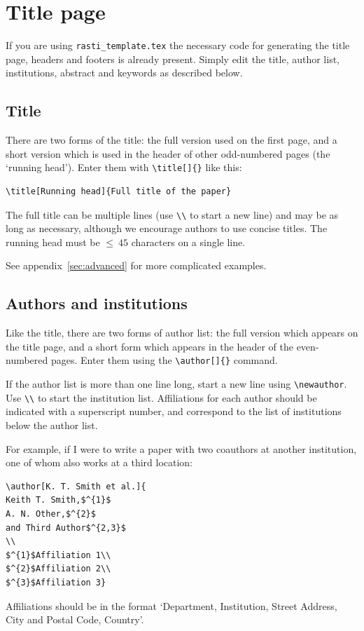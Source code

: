 \documentclass[fleqn,usenatbib,useAMS]{rasti}
\begin{document}
\section{Title page}

If you are using \texttt{rasti\_template.tex} the necessary code for generating the title page, headers and footers is already present.
Simply edit the title, author list, institutions, abstract and keywords as described below.

\subsection{Title}
There are two forms of the title: the full version used on the first page, and a short version which is used in the header of other odd-numbered pages (the `running head').
Enter them with \verb'\title[]{}' like this:
\begin{verbatim}
\title[Running head]{Full title of the paper}
\end{verbatim}
The full title can be multiple lines (use \verb'\\' to start a new line) and may be as long as necessary, although we encourage authors to use concise titles. The running head must be $\le~45$ characters on a single line.

See appendix~\ref{sec:advanced} for more complicated examples.

\subsection{Authors and institutions}

Like the title, there are two forms of author list: the full version which appears on the title page, and a short form which appears in the header of the even-numbered pages. Enter them using the \verb'\author[]{}' command.

If the author list is more than one line long, start a new line using \verb'\newauthor'. Use \verb'\\' to start the institution list. Affiliations for each author should be indicated with a superscript number, and correspond to the list of institutions below the author list.

For example, if I were to write a paper with two coauthors at another institution, one of whom also works at a third location:
\begin{verbatim}
\author[K. T. Smith et al.]{
Keith T. Smith,$^{1}$
A. N. Other,$^{2}$
and Third Author$^{2,3}$
\\
$^{1}$Affiliation 1\\
$^{2}$Affiliation 2\\
$^{3}$Affiliation 3}
\end{verbatim}
Affiliations should be in the format `Department, Institution, Street Address, City and Postal Code, Country'.
\end{document}
